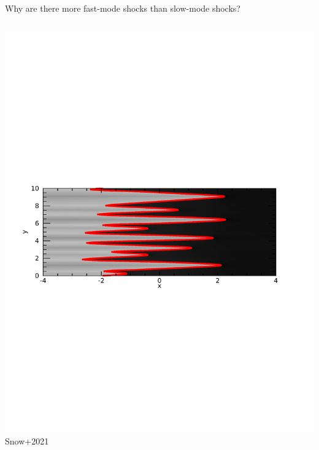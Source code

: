 \documentclass[10pt,aspectratio=169,usenames,dvipsnames]{beamer}
\begin{document}
\begin{frame}{Why are there more fast-mode shocks than slow-mode shocks?}
\begin{columns}
\begin{column}{0.5\textwidth}
\includegraphics[width=0.95\linewidth,clip=true,trim=1.0cm 10.0cm 2.5cm 10.0cm]{2023AAPPS-DPP/Figures/shockstabtest5b.pdf} \\ {\small Snow+2021 }
\end{column}
\end{columns}
\end{frame}
\end{document}
